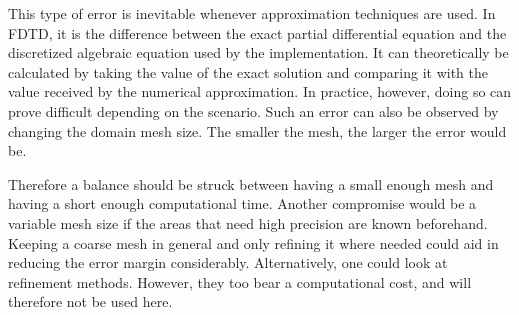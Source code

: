 This type of error is inevitable whenever approximation techniques are used. In FDTD, it is the difference between the exact partial differential equation and the discretized algebraic equation used by the implementation. It can theoretically be calculated by taking the value of the exact solution and comparing it with the value received by the numerical approximation. In practice, however, doing so can prove difficult depending on the scenario. Such an error can also be observed by changing the domain mesh size. The smaller the mesh, the larger the error would be. 

Therefore a balance should be struck between having a small enough mesh and having a short enough computational time. Another compromise would be a variable mesh size if the areas that need high precision are known beforehand. Keeping a coarse mesh in general and only refining it where needed could aid in reducing the error margin considerably.  Alternatively, one could look at refinement methods. However, they too bear a computational cost, and will therefore not be used here.
